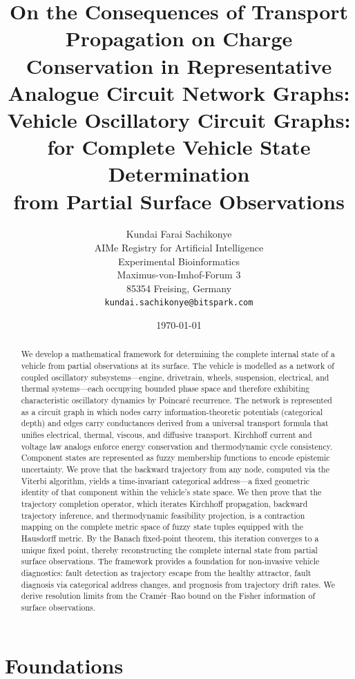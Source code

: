 \documentclass[twocolumn,10pt,a4paper]{article}
\title{\textbf{On the Consequences of Transport Propagation on Charge Conservation in Representative Analogue Circuit Network Graphs: Vehicle Oscillatory Circuit Graphs:\\
for Complete Vehicle State Determination\\
from Partial Surface Observations}}
\author{
Kundai Farai Sachikonye\\
AIMe Registry for Artificial Intelligence\\
Experimental Bioinformatics\\
Maximus-von-Imhof-Forum 3\\
85354 Freising, Germany\\
\texttt{kundai.sachikonye@bitspark.com}
}
\date{\today}
\theoremstyle{definition}
\theoremstyle{remark}
\begin{document}

\maketitle

\begin{abstract}
We develop a mathematical framework for determining the complete internal state of a vehicle from partial observations at its surface. The vehicle is modelled as a network of coupled oscillatory subsystems---engine, drivetrain, wheels, suspension, electrical, and thermal systems---each occupying bounded phase space and therefore exhibiting characteristic oscillatory dynamics by Poincar\'{e} recurrence. The network is represented as a circuit graph in which nodes carry information-theoretic potentials (categorical depth) and edges carry conductances derived from a universal transport formula that unifies electrical, thermal, viscous, and diffusive transport. Kirchhoff current and voltage law analogs enforce energy conservation and thermodynamic cycle consistency. Component states are represented as fuzzy membership functions to encode epistemic uncertainty. We prove that the backward trajectory from any node, computed via the Viterbi algorithm, yields a time-invariant categorical address---a fixed geometric identity of that component within the vehicle's state space. We then prove that the trajectory completion operator, which iterates Kirchhoff propagation, backward trajectory inference, and thermodynamic feasibility projection, is a contraction mapping on the complete metric space of fuzzy state tuples equipped with the Hausdorff metric. By the Banach fixed-point theorem, this iteration converges to a unique fixed point, thereby reconstructing the complete internal state from partial surface observations. The framework provides a foundation for non-invasive vehicle diagnostics: fault detection as trajectory escape from the healthy attractor, fault diagnosis via categorical address changes, and prognosis from trajectory drift rates. We derive resolution limits from the Cram\'{e}r--Rao bound on the Fisher information of surface observations.
\end{abstract}


\part{Foundations}
\end{document}
